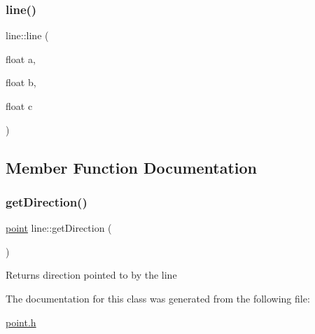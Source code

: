 \mbox{\label{classline_a5c7c332f2c5e4badc9bdfa807b4aef86}} 
\subsubsection{\texorpdfstring{line()}{line()}\hspace{0.1cm}{\footnotesize\ttfamily [2/2]}}
{\footnotesize\ttfamily line\+::line (\begin{DoxyParamCaption}\item[{float}]{a,  }\item[{float}]{b,  }\item[{float}]{c }\end{DoxyParamCaption})}



\subsection{Member Function Documentation}
\mbox{\label{classline_a72da40e3a2e2efaa58ee7a379415b2c5}} 
\subsubsection{\texorpdfstring{get\+Direction()}{getDirection()}}
{\footnotesize\ttfamily \mbox{\hyperlink{classpoint}{point}} line\+::get\+Direction (\begin{DoxyParamCaption}{ }\end{DoxyParamCaption})}

\begin{DoxyReturn}{Returns}
direction pointed to by the line 
\end{DoxyReturn}


The documentation for this class was generated from the following file\+:\begin{DoxyCompactItemize}
\item 
\mbox{\hyperlink{point_8h}{point.\+h}}\end{DoxyCompactItemize}
